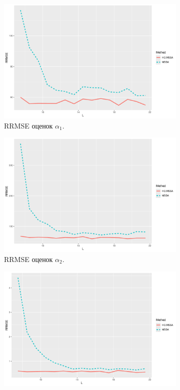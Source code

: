 \documentclass[specialist,
  substylefile=spbu.rtx,
subf,href,colorlinks=true, 12pt]{disser}
\theoremstyle{plain}
\theoremstyle{definition}
\theoremstyle{remark}
\begin{document}
\begin{figure}[!ht]
  \centering
  \begin{subfigure}{0.49\linewidth}
    \includegraphics[width=\linewidth]{rate1_L_small_eq_rates.pdf}
    \caption{RRMSE оценок $\alpha_1$.}
    \label{fig:rate1_L_small_eq_rates}
  \end{subfigure}
  \begin{subfigure}{0.49\linewidth}
    \includegraphics[width=\linewidth]{rate2_L_small_eq_rates.pdf}
    \caption{RRMSE оценок $\alpha_2$.}
    \label{fig:rate2_L_small_eq_rates}
  \end{subfigure}
  \begin{subfigure}{0.49\linewidth}
    \includegraphics[width=\linewidth]{freq1_L_small_eq_rates.pdf}

\end{subfigure}
\end{figure}
\end{document}
